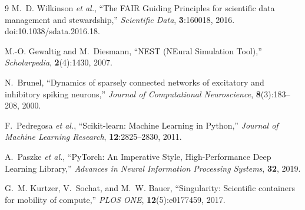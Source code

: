 \documentclass[11pt,a4paper]{article}
\begin{document}
\begin{thebibliography}{9}
M.~D. Wilkinson \emph{et al.},
``The FAIR Guiding Principles for scientific data management and stewardship,''
\emph{Scientific Data}, \textbf{3}:160018, 2016. doi:10.1038/sdata.2016.18.

M.-O. Gewaltig and M.~Diesmann,
``NEST (NEural Simulation Tool),'' \emph{Scholarpedia}, \textbf{2}(4):1430, 2007.

N.~Brunel,
``Dynamics of sparsely connected networks of excitatory and inhibitory spiking neurons,''
\emph{Journal of Computational Neuroscience}, \textbf{8}(3):183--208, 2000.

F.~Pedregosa \emph{et al.},
``Scikit-learn: Machine Learning in Python,''
\emph{Journal of Machine Learning Research}, \textbf{12}:2825--2830, 2011.

A.~Paszke \emph{et al.},
``PyTorch: An Imperative Style, High-Performance Deep Learning Library,''
\emph{Advances in Neural Information Processing Systems}, \textbf{32}, 2019.

G.~M. Kurtzer, V.~Sochat, and M.~W. Bauer,
``Singularity: Scientific containers for mobility of compute,''
\emph{PLOS ONE}, \textbf{12}(5):e0177459, 2017.
\end{thebibliography}
\end{document}
